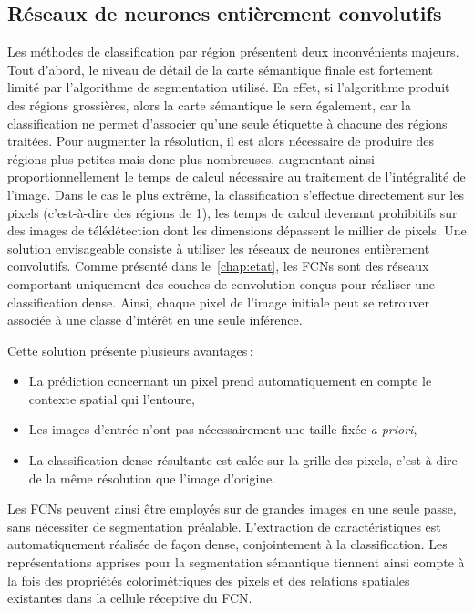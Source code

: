 \subsection{Réseaux de neurones entièrement convolutifs}

Les méthodes de classification par région présentent deux inconvénients majeurs. Tout d'abord, le niveau de détail de la carte sémantique finale est fortement limité par l'algorithme de segmentation utilisé. En effet, si l'algorithme produit des régions grossières, alors la carte sémantique le sera également, car la classification ne permet d'associer qu'une seule étiquette à chacune des régions traitées. Pour augmenter la résolution, il est alors nécessaire de produire des régions plus petites mais donc plus nombreuses, augmentant ainsi proportionnellement le temps de calcul nécessaire au traitement de l'intégralité de l'image. Dans le cas le plus extrême, la classification s'effectue directement sur les pixels (c'est-à-dire des régions de \SI{1}{\px}), les temps de calcul devenant prohibitifs sur des images de télédétection dont les dimensions dépassent le millier de pixels.
Une solution envisageable consiste à utiliser les réseaux de neurones entièrement convolutifs. Comme présenté dans le~\cref{chap:etat}, les \glspl{FCN} sont des réseaux comportant uniquement des couches de convolution conçus pour réaliser une classification dense. Ainsi, chaque pixel de l'image initiale peut se retrouver associée à une classe d'intérêt en une seule inférence.

Cette solution présente plusieurs avantages\,:
\begin{itemize}
	\item La prédiction concernant un pixel prend automatiquement en compte le contexte spatial qui l'entoure,
	\item Les images d'entrée n'ont pas nécessairement une taille fixée \emph{a priori},
	\item La classification dense résultante est calée sur la grille des pixels, c'est-à-dire de la même résolution que l'image d'origine.
\end{itemize}

Les \glspl{FCN} peuvent ainsi être employés sur de grandes images en une seule passe, sans nécessiter de segmentation préalable. L'extraction de caractéristiques est automatiquement réalisée de façon dense, conjointement à la classification. Les représentations apprises pour la segmentation sémantique tiennent ainsi compte à la fois des propriétés colorimétriques des pixels et des relations spatiales existantes dans la cellule réceptive du \gls{FCN}.

